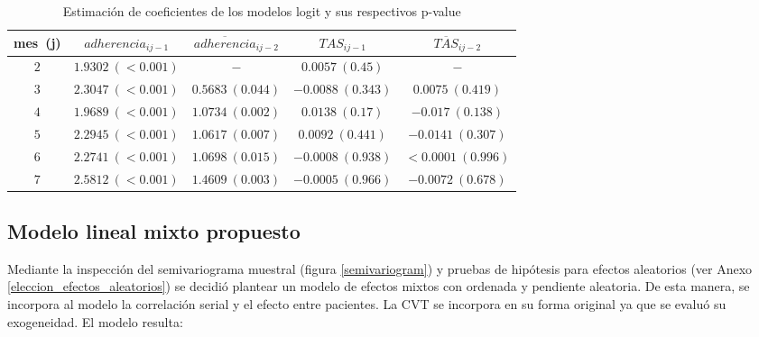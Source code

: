 \documentclass[spanish]{article}
\numberwithin{figure}{subsection}
\numberwithin{equation}{subsection}
\numberwithin{table}{subsection}
\begin{document}
\begin{table}[H]
	\centering
	\caption{Estimación de coeficientes de los modelos logit y sus respectivos p-value}
	\label{exog_table}
	\begin{tabular}{*{5}{|c}|}
		\hline
		mes\ (j) & $adherencia_{ij-1}$ & $\overline{adherencia}_{ij-2}$ & $TAS_{ij-1}$ &
		$\overline{TAS}_{ij-2}$ \\
		\hline
		\hline
		$2$ & $1.9302\ (<0.001)$ & $-$ & $0.0057\ (0.45)$ & $-$ \\
		$3$ & $2.3047\ (<0.001)$ & $0.5683\ (0.044)$ & $-0.0088\ (0.343)$ &
		$0.0075\ (0.419)$ \\
		$4$ & $1.9689\ (<0.001)$ & $1.0734\ (0.002)$ & $0.0138\ (0.17)$ &
		$-0.017\ (0.138)$ \\
		$5$ & $2.2945\ (<0.001)$ & $1.0617\ (0.007)$ & $0.0092\ (0.441)$ &
		$-0.0141\ (0.307)$ \\
		$6$ & $2.2741\ (<0.001)$ & $1.0698\ (0.015)$ & $-0.0008\ (0.938)$ &
		$<0.0001\ (0.996)$ \\
		$7$ & $2.5812\ (<0.001)$ & $1.4609\ (0.003)$ & $-0.0005\ (0.966)$ &
		$-0.0072\ (0.678)$ \\
		\hline
	\end{tabular}
\end{table}

\subsection{Modelo lineal mixto propuesto}

Mediante la inspección del semivariograma muestral (figura \ref{semivariogram})
y pruebas de hipótesis para efectos aleatorios (ver Anexo
\ref{eleccion_efectos_aleatorios}) se decidió plantear un modelo de efectos
mixtos con ordenada y pendiente aleatoria. De esta manera, se incorpora al
modelo la correlación serial y el efecto entre pacientes. La CVT se incorpora en
su forma original ya que se evaluó su exogeneidad. El modelo resulta:



\end{document}
